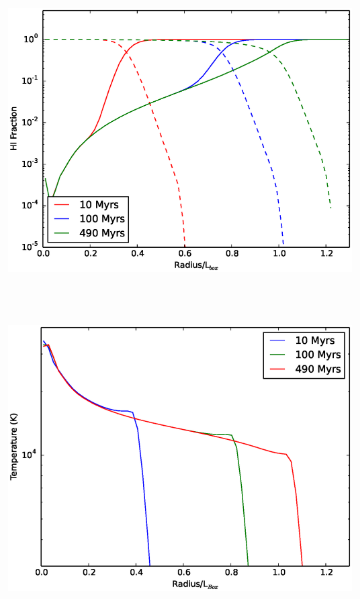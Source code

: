 \begin{figure}
        \centering
        \begin{subfigure}[b]{0.45\textwidth}
                \includegraphics[width=\textwidth]{graphics/HIProfile.eps}
                \caption{}
                \label{fig:stromgrenthermaltemp}
        \end{subfigure}
        ~ 
        \begin{subfigure}[b]{0.45\textwidth}
                \includegraphics[width=\textwidth]{graphics/thermalTempProfile.eps}
                \caption{}
                \label{fig:stromgrenthermalH}
        \end{subfigure}

\end{figure}
